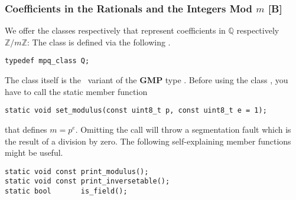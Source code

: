 \subsubsection{Coefficients in the Rationals and the Integers Mod \texorpdfstring{$m$}{m} [B]}
\label{program:libhomology:CoefficientT:our_implementation}
We offer the classes  respectively  that represent coefficients in $\mathbb Q$ respectively $\mathbb Z / m \mathbb Z$:
The class  is defined via the following .
\begin{lstlisting}
typedef mpq_class Q;
\end{lstlisting}
The class  itself is the \cpp\ variant of the {\bf GMP} type .
Before using the class , you have to call the static member function
\begin{lstlisting}
static void set_modulus(const uint8_t p, const uint8_t e = 1);
\end{lstlisting}
that defines $m = p^e$.
Omitting the call will throw a segmentation fault which is the result of a division by zero.
The following self-explaining member functions might be useful.
\begin{lstlisting}
static void const print_modulus();    
static void const print_inversetable();
static bool       is_field();
\end{lstlisting}
